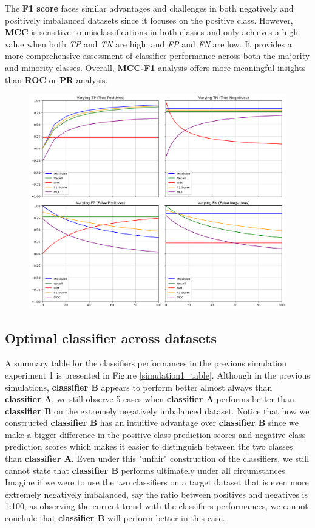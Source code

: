 \documentclass[12pt, oneside]{amsart}
\theoremstyle{definition}
\theoremstyle{remark}
\numberwithin{equation}{section}
\begin{document}
The \textbf{F1 score} faces similar advantages and challenges in both negatively and positively imbalanced datasets since it focuses on the positive class. However, \textbf{MCC} is sensitive to misclassifications in both classes and only achieves a high value when both \textit{TP} and \textit{TN} are high, and \textit{FP} and \textit{FN} are low. It provides a more comprehensive assessment of classifier performance across both the majority and minority classes. Overall, \textbf{MCC-F1} analysis offers more meaningful insights than \textbf{ROC} or \textbf{PR} analysis.
\begin{figure}[hbt!]
    \centering
    \includegraphics[scale=0.35]{Report/Figure/simulation3.jpg}
    \caption{}
    \label{simulation3}
\end{figure}
\FloatBarrier

\subsection{Optimal classifier across datasets}
A summary table for the classifiers performances in the previous simulation experiment 1 is presented in Figure \ref{simulation1_table}. Although in the previous simulations, \textbf{classifier B} appears to perform better almost always than \textbf{classifier A}, we still observe 5 cases when \textbf{classifier A} performs better than \textbf{classifier B} on the extremely negatively imbalanced dataset. Notice that how we constructed \textbf{classifier B} has an intuitive advantage over \textbf{classifier B} since we make a bigger difference in the positive class prediction scores and negative class prediction scores which makes it easier to distinguish between the two classes than \textbf{classifier A}.  Even under this "unfair" construction of the classifiers, we still cannot state that \textbf{classifier B} performs ultimately under all circumstances. Imagine if we were to use the two classifiers on a target dataset that is even more extremely negatively imbalanced, say the ratio between positives and negatives is 1:100, as observing the current trend with the classifiers performances, we cannot conclude that \textbf{classifier B} will perform better in this case. 
\end{document}
